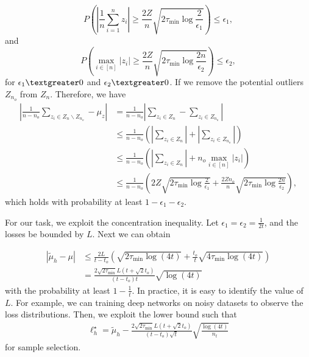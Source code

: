 \documentclass[11pt]{article}
\begin{document}
\begin{equation}
    P\left(\left|\frac{1}{n}\sum_{i=1}^n z_i\right|\geq\frac{2Z}{n}\sqrt{2\tau_{\min}\log\frac{2}{\epsilon_1}}\right)\leq\epsilon_1,
\end{equation}
and 
\begin{equation}
    P\left(\max_{i\in[n]}\left|z_i\right|\geq\frac{2Z}{n}\sqrt{2\tau_{\min}\log\frac{2n}{\epsilon_2}}\right)\leq\epsilon_2,
\end{equation}
for $\epsilon_1\textgreater 0$ and $\epsilon_2\textgreater 0$. If we remove the potential outliers $Z_{n_o}$ from $Z_n$. Therefore, we have 
\begin{equation}
\begin{aligned}
   \left|\frac{1}{n-n_o}\sum_{z_i\in Z_n\backslash Z_{n_o}}-\mu_z\right|&=\frac{1}{n-n_o}\left|\sum_{z_i\in Z_n}-\sum_{z_i\in Z_{n_o}}\right|\\
   &\leq\frac{1}{n-n_o}\left(\left|\sum_{z_i\in Z_n}\right|+\left|\sum_{z_i\in Z_{n_o}}\right|\right)\\
   &\leq\frac{1}{n-n_o}\left(\left|\sum_{z_i\in Z_n}\right|+n_o\max_{i\in[n]}\left|z_i\right|\right)\\
   &\leq\frac{1}{n-n_o}\left(2Z\sqrt{2\tau_{\min}\log\frac{2}{\epsilon_1}}+\frac{2Z n_o}{n}\sqrt{2\tau_{\min}\log\frac{2n}{\epsilon_2}}\right),
\end{aligned}
\end{equation}
which holds with probability at least $1-\epsilon_1-\epsilon_2$. 

For our task, we exploit the concentration inequality. Let $\epsilon_1=\epsilon_2=\frac{1}{2t}$, and the losses be bounded by $L$. Next we can obtain


\begin{equation}
\begin{aligned}
   |\tilde{\mu}_h-\mu|&\leq\frac{2L}{t-t_o}\left(\sqrt{2\tau_{\min}\log (4t)}+\frac{t_o}{t}\sqrt{4\tau_{\min}\log(4t)}\right)\\
   &=\frac{2\sqrt{2\tau_{\min}}L(t+\sqrt{2}t_o)}{(t-t_o)t}\sqrt{\log(4t)}
\end{aligned}
\end{equation}
with the probability at least $1-\frac{1}{t}$. In practice, it is easy to identify the value of $L$. For example, we can training deep networks on noisy datasets to observe the loss distributions. Then, we exploit the lower bound such that
\begin{equation}
\begin{aligned}
   \ell_{h}^{\star}=\tilde{\mu}_h-\frac{2\sqrt{2\tau_{\min}}L(t+\sqrt{2}t_o)}{(t-t_o)\sqrt{t}}\sqrt{\frac{\log(4t)}{n_t}}
\end{aligned}
\end{equation}
for sample selection.
\end{document}
